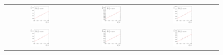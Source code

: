 \begin{figure}[ht]
\begin{tabular}{ccc}
    \includegraphics[width=0.3\textwidth]{figures/ResFit_Spring10QCDFlat_CB_Eta0_ExtrapolatedPar0_PtBin3} &
    \includegraphics[width=0.3\textwidth]{figures/ResFit_Spring10QCDFlat_CB_Eta0_ExtrapolatedPar0_PtBin4} &
    \includegraphics[width=0.3\textwidth]{figures/ResFit_Spring10QCDFlat_CB_Eta0_ExtrapolatedPar0_PtBin5} \\

    \includegraphics[width=0.3\textwidth]{figures/ResFit_Spring10QCDFlat_CB_Eta0_ExtrapolatedPar0_PtBin6} &
    \includegraphics[width=0.3\textwidth]{figures/ResFit_Spring10QCDFlat_CB_Eta0_ExtrapolatedPar0_PtBin7} &
    \includegraphics[width=0.3\textwidth]{figures/ResFit_Spring10QCDFlat_CB_Eta0_ExtrapolatedPar0_PtBin8} \\


\end{tabular}
\end{figure}
